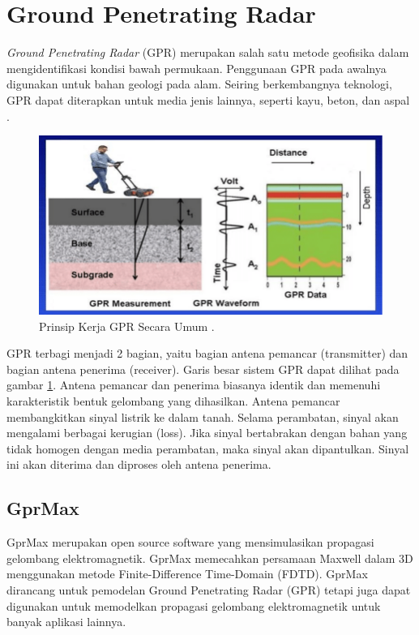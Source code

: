 \section{Ground Penetrating Radar}
\label{sec:groundPenetratingRadar}

\emph{Ground Penetrating Radar} (GPR) merupakan salah satu metode geofisika dalam mengidentifikasi kondisi bawah permukaan. 
Penggunaan GPR pada awalnya digunakan untuk bahan geologi pada alam. 
Seiring berkembangnya teknologi, GPR dapat diterapkan untuk media jenis lainnya, seperti kayu, beton, dan aspal \parencite{jol2008ground}.

\begin{figure}[ht]
  \centering
  \includegraphics[scale=0.35]{gambar/prinsipGPR.png}
  \caption{Prinsip Kerja GPR Secara Umum \parencite{gprPrinciple}.}
  \label{fig:prinsipGpr}
\end{figure}

GPR terbagi menjadi 2 bagian, yaitu bagian antena pemancar (transmitter) dan bagian antena penerima (receiver). 
Garis besar sistem GPR dapat dilihat pada gambar \ref{fig:prinsipGpr}. 
Antena pemancar dan penerima biasanya identik dan memenuhi karakteristik bentuk gelombang yang dihasilkan. 
Antena pemancar membangkitkan sinyal listrik ke dalam tanah. 
Selama perambatan, sinyal akan mengalami berbagai kerugian (loss). 
Jika sinyal bertabrakan dengan bahan yang tidak homogen dengan media perambatan, maka sinyal akan dipantulkan. 
Sinyal ini akan diterima dan diproses oleh antena penerima.

\subsection{GprMax}
\label{subsec:gprMax}

GprMax merupakan open source software yang mensimulasikan propagasi gelombang elektromagnetik. 
GprMax memecahkan persamaan Maxwell dalam 3D menggunakan metode Finite-Difference Time-Domain (FDTD). 
GprMax dirancang untuk pemodelan Ground Penetrating Radar (GPR) tetapi juga dapat digunakan untuk memodelkan propagasi gelombang elektromagnetik untuk banyak aplikasi lainnya. 


